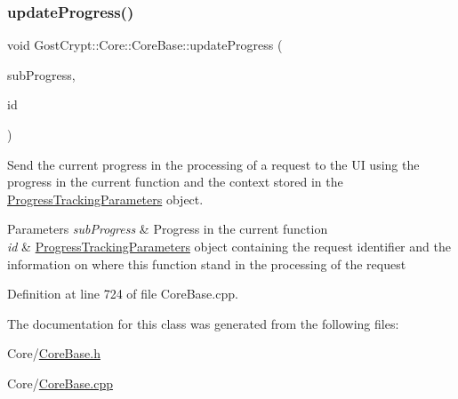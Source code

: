 \subsubsection{\texorpdfstring{update\+Progress()}{updateProgress()}}
{\footnotesize\ttfamily void Gost\+Crypt\+::\+Core\+::\+Core\+Base\+::update\+Progress (\begin{DoxyParamCaption}\item[{qreal}]{sub\+Progress,  }\item[{\hyperlink{struct_gost_crypt_1_1_core_1_1_progress_tracking_parameters}{Progress\+Tracking\+Parameters}}]{id }\end{DoxyParamCaption})\hspace{0.3cm}{\ttfamily [protected]}}



Send the current progress in the processing of a request to the UI using the progress in the current function and the context stored in the \hyperlink{struct_gost_crypt_1_1_core_1_1_progress_tracking_parameters}{Progress\+Tracking\+Parameters} object. 


\begin{DoxyParams}{Parameters}
{\em sub\+Progress} & Progress in the current function \\
\hline
{\em id} & \hyperlink{struct_gost_crypt_1_1_core_1_1_progress_tracking_parameters}{Progress\+Tracking\+Parameters} object containing the request identifier and the information on where this function stand in the processing of the request \\
\hline
\end{DoxyParams}


Definition at line 724 of file Core\+Base.\+cpp.



The documentation for this class was generated from the following files\+:\begin{DoxyCompactItemize}
\item 
Core/\hyperlink{_core_base_8h}{Core\+Base.\+h}\item 
Core/\hyperlink{_core_base_8cpp}{Core\+Base.\+cpp}\end{DoxyCompactItemize}
